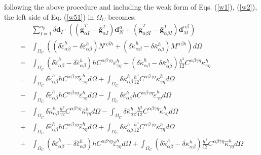 following the above procedure and including the weak form of Eqs. (\ref{w1}), (\ref{w2}), the left side of Eq. (\ref{w51}) in $\Omega_C$ becomes:
\begin{equation}
\begin{split}
&\sum_{I=1}^{n_p} \delta \boldsymbol d_I \cdot  \left ( 
(\tilde{\boldsymbol g}^T_{\alpha I} - \bar{\boldsymbol g}^T_{\alpha I}) \boldsymbol d^\alpha_N
+(\tilde{\boldsymbol g}^T_{\alpha\beta I} - \bar{\boldsymbol g}^T_{\alpha\beta I}) \boldsymbol d^{\alpha\beta}_M \right) \\
=& \int_{\Omega_C}\left ( (\delta \tilde \varepsilon^h_{\alpha\beta} - \delta \bar \varepsilon^h_{\alpha\beta}) N^{\alpha\beta h}
+ (\delta \tilde \kappa^h_{\alpha\beta} - \delta \bar \kappa^h_{\alpha\beta})M^{\alpha\beta h}
\right ) d\Omega \\
= &\int_{\Omega_C} (\delta \tilde \varepsilon^h_{\alpha\beta} - \delta \bar \varepsilon^h_{\alpha\beta}) hC^{\alpha\beta\gamma\eta} \varepsilon^h_{\gamma\eta}
+ (\delta \tilde \kappa^h_{\alpha\beta} - \delta \bar \kappa^h_{\alpha\beta}) \frac{h^3}{12}C^{\alpha\beta\gamma\eta}\kappa^h_{\gamma\eta} \\
= &\int_{\Omega_C}\delta \tilde \varepsilon^h_{\alpha\beta}hC^{\alpha\beta\gamma\eta} \tilde\varepsilon^h_{\gamma\eta} d\Omega
+ \int_{\Omega_C}\delta \tilde \kappa^h_{\alpha\beta} \frac{h^3}{12}C^{\alpha\beta\gamma\eta}\tilde \kappa^h_{\gamma\eta}d\Omega \\
- &\int_{\Omega_C}\delta \tilde \varepsilon^h_{\alpha\beta}hC^{\alpha\beta\gamma\eta} \bar \varepsilon^h_{\gamma\eta} d\Omega
- \int_{\Omega_C}\delta \bar \varepsilon^h_{\alpha\beta}hC^{\alpha\beta\gamma\eta} \tilde \varepsilon^h_{\gamma\eta} d\Omega \\
- &\int_{\Omega_C}\delta \tilde \kappa^h_{\alpha\beta} \frac{h^3}{12}C^{\alpha\beta\gamma\eta}\bar \kappa^h_{\gamma\eta}d\Omega 
- \int_{\Omega_C}\delta \bar \kappa^h_{\alpha\beta} \frac{h^3}{12}C^{\alpha\beta\gamma\eta}\tilde \kappa^h_{\gamma\eta}d\Omega \\
+ &\int_{\Omega_C}\delta \bar \varepsilon^h_{\alpha\beta}hC^{\alpha\beta\gamma\eta} \bar \varepsilon^h_{\gamma\eta} d\Omega
+ \int_{\Omega_C}\delta \bar \kappa^h_{\alpha\beta} \frac{h^3}{12}C^{\alpha\beta\gamma\eta}\bar \kappa^h_{\gamma\eta}d\Omega \\
+ &\int_{\Omega_C}(\delta \tilde \varepsilon^h_{\alpha\beta} - \delta \bar \varepsilon^h_{\alpha\beta})hC^{\alpha\beta\gamma\eta} \hat \varepsilon^h_{\gamma\eta} d\Omega
+ \int_{\Omega_C}(\delta \tilde \kappa^h_{\alpha\beta} - \delta \bar \kappa^h_{\alpha\beta})\frac{h^3}{12}C^{\alpha\beta\gamma\eta}\hat \kappa^h_{\gamma\eta}d\Omega \\
\end{split}
\end{equation}
